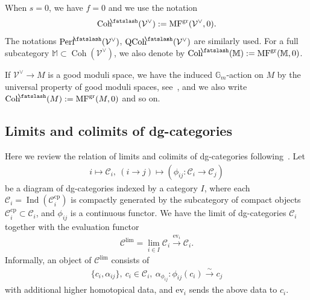 \documentclass [11pt,oneside,a4paper,mathscr]{amsart}
\theoremstyle{definition}
\newcommand{\Coh}{\operatorname{Coh}}
\newcommand{\Ind}{\operatorname{Ind}}
\newcommand{\shear}{{\mathbin{\mkern-6mu\fatslash}}}
\begin{document}
When $s=0$, we have $f=0$ and we use the notation 
\begin{align*}
    \Coh^{\shear}(\mathcal{V}^{\vee}):=
    \mathrm{MF}^{\mathrm{gr}}(\mathcal{V}^{\vee}, 0). 
\end{align*}
The notations $\mathrm{Perf}^{\shear}(\mathcal{V}^{\vee})$, 
$\mathrm{QCoh}^{\shear}(\mathcal{V}^{\vee})$ are similarly used. 
For a full subcategory $\mathbb{M}\subset \Coh(\mathcal{V}^{\vee})$, 
we also denote by $\Coh^{\shear}(\mathbb{M}):=\mathrm{MF}^{\mathrm{gr}}(\mathbb{M}, 0)$.

If $\mathcal{V}^{\vee} \to M$ is a good moduli space, we have the 
induced $\mathbb{G}_m$-action on $M$ 
by the universal property of good moduli spaces, see~\cite[Main properties (4)]{MR3237451}, and we also 
write $\Coh^{\shear}(M):=\mathrm{MF}^{\mathrm{gr}}(M, 0)$ and so on. 

\subsection{Limits and colimits of dg-categories}
    Here we review the relation of limits and colimits of dg-categories 
    following~\cite[Section~1.7]{DGbun}. 
Let 
\begin{align*}
    i \mapsto \mathcal{C}_i, \ (i\to j) \mapsto (\phi_{ij} \colon \mathcal{C}_i \to \mathcal{C}_j)
\end{align*}
be a diagram of dg-categories indexed by a category $I$, 
where each $\mathcal{C}_i=\Ind(\mathcal{C}_i^{\mathrm{cp}})$ is compactly generated 
by the subcategory of compact objects $\mathcal{C}_i^{\mathrm{cp}} \subset \mathcal{C}_i$, 
and $\phi_{ij}$ is a continuous functor. 
We have the limit of dg-categories $\mathcal{C}_i$ together with
the evaluation functor 
\begin{align}\label{C:lim}
    \mathcal{C}^{\mathrm{lim}}=\lim_{i\in I} \mathcal{C}_i \stackrel{\mathrm{ev}_i}{\to} \mathcal{C}_i. 
\end{align}
Informally, an object of $\mathcal{C}^{\mathrm{lim}}$ consists of 
\begin{align*}
    \{c_i, \alpha_{ij}\}, \ c_i \in \mathcal{C}_i, \ \alpha_{\phi_{ij}} \colon 
    \phi_{ij}(c_i) \stackrel{\sim}{\to} c_j
\end{align*}
with additional higher homotopical data, and $\mathrm{ev}_i$ sends 
the above data to $c_i$. 
\end{document}
